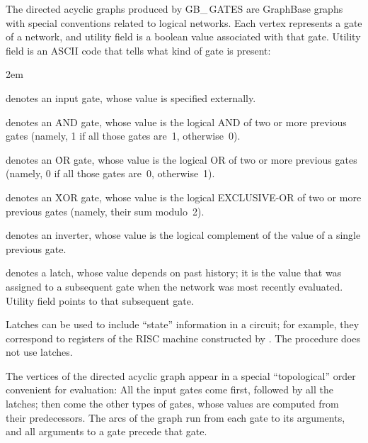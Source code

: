 The directed acyclic graphs produced by {\sc GB\_\,GATES} are GraphBase
graphs with special conventions related to logical networks. Each vertex
represents a gate of a network, and utility field  is a boolean
value associated with that gate. Utility field  is an ASCII code
that tells what kind of gate is present:
{\advance\parindent 2em
\smallskip
\item{} denotes an input gate, whose value is specified externally.

\smallskip
\item{} denotes an \.{AND} gate, whose value is the logical {\sc
AND} of
two or more previous gates (namely, 1 if all those gates are~1, otherwise~0).

\smallskip
\item{} denotes an \.{OR} gate, whose value is the logical {\sc OR}
of
two or more previous gates (namely, 0 if all those gates are~0, otherwise~1).

\smallskip
\item{} denotes an \.{XOR} gate, whose value is the logical {\sc
EXCLUSIVE-OR} of two or more previous gates (namely, their sum modulo~2).

\smallskip
\item{} denotes an inverter, whose value is the logical complement
of
the value of a single previous gate.

\smallskip
\item{} denotes a latch, whose value depends on past history; it is
the value that was assigned to a subsequent gate when the network was most
recently evaluated. Utility field  points to that subsequent gate.

\smallskip}\noindent
Latches can be used to include ``state'' information in a circuit; for example,
they correspond to registers of the RISC machine constructed by .
The  procedure does not use latches.

The vertices of the directed acyclic graph appear in a special ``topological''
order convenient for evaluation: All the input gates come first, followed
by all the latches; then come the other types of gates, whose values are
computed from their predecessors. The arcs of the graph run from each gate
to its arguments, and all arguments to a gate precede that gate.

